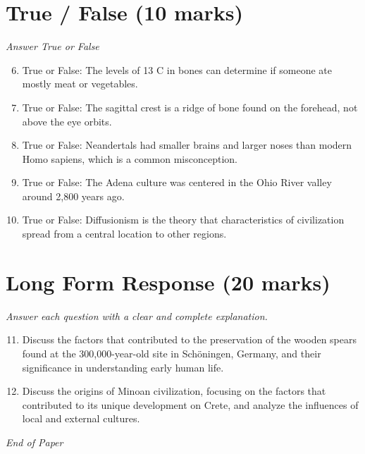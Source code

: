 \documentclass[12pt]{article}
\begin{document}
\section*{True / False (10 marks)}
\textit{Answer True or False}
\begin{enumerate}[label=\arabic*.]
\setcounter{enumi}{5}
\item True or False: The levels of 13 C in bones can determine if someone ate mostly meat or vegetables.
\item True or False: The sagittal crest is a ridge of bone found on the forehead, not above the eye orbits.
\item True or False: Neandertals had smaller brains and larger noses than modern Homo sapiens, which is a common misconception.
\item True or False: The Adena culture was centered in the Ohio River valley around 2,800 years ago.
\item True or False: Diffusionism is the theory that characteristics of civilization spread from a central location to other regions.
\end{enumerate}

\section*{Long Form Response (20 marks)}
\textit{Answer each question with a clear and complete explanation.}
\begin{enumerate}[label=\arabic*.]
\setcounter{enumi}{10}
\item Discuss the factors that contributed to the preservation of the wooden spears found at the 300,000-year-old site in Schöningen, Germany, and their significance in understanding early human life.
\item Discuss the origins of Minoan civilization, focusing on the factors that contributed to its unique development on Crete, and analyze the influences of local and external cultures.
\end{enumerate}

\vfill
\noindent\textit{End of Paper}
\end{document}
